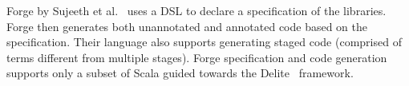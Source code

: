Forge by Sujeeth et al.~\cite{forge} uses a DSL to declare a specification of the libraries.
 Forge then generates both unannotated and annotated code based on the specification.
 Their language also supports generating staged code (comprised of terms different from multiple stages).
 Forge specification and code generation supports only a subset of Scala guided towards the
 Delite~\cite{brown_heterogeneous_2011,composition-ecoop2013} framework.
